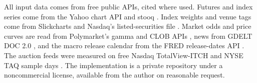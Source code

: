 All input data comes from free public APIs, cited where used. Futures and
index series come from the Yahoo chart API and stooq
\citep{yahoo2026chartapi,stooq2026spx}. Index weights and venue tags come
from Slickcharts and Nasdaq's listed-securities file
\citep{slickcharts2026sp500,nasdaqtrader2026listed}. Market odds and price
curves are read from Polymarket's gamma and CLOB APIs
\citep{polymarket2026gamma,polymarket2026clob}, news from GDELT DOC 2.0
\citep{gdelt2017doc}, and the macro release calendar from the FRED
release-dates API \citep{fred2026releasedates}. The auction feeds were
measured on free Nasdaq TotalView-ITCH and NYSE TAQ sample days
\citep{nasdaq2026itchsamples,nyse2026taqimbalances}. The implementation is
a private repository under a noncommercial license, available from the
author on reasonable request.
